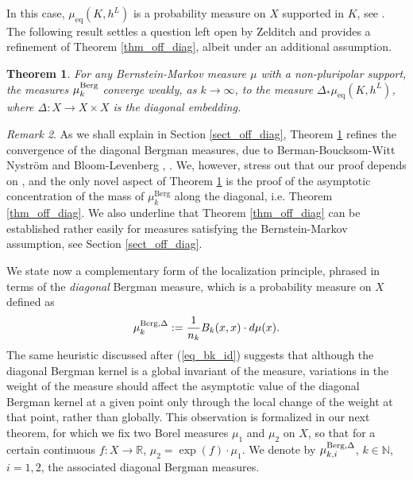 \documentclass[12pt]{article}
\numberwithin{equation}{section}
\theoremstyle{theorem}
\newtheorem{thm}{Theorem}[section]
\theoremstyle{definition}
\theoremstyle{remark}
\newtheorem{rem}[thm]{Remark}
\newcommand{\real}{\mathbb{R}}
\newcommand{\nat}{\mathbb{N}}
\begin{document}
	In this case, $\mu_{\mathrm{eq}}(K, h^L)$ is a probability measure on $X$ supported in $K$, see \cite[Proposition 1.10]{BermanBouckBalls}.
	The following result settles a question left open by Zelditch \cite[after Theorem 2.5]{ZelditchErgodSurvey} and provides a refinement of Theorem \ref{thm_off_diag}, albeit under an additional assumption.
	\begin{thm}\label{thm_off_diag_bm}
		For any Bernstein-Markov measure $\mu$ with a non-pluripolar support, the measures $\mu_k^{\rm{Berg}}$ converge weakly, as $k \to \infty$, to the measure $\Delta_* \mu_{\mathrm{eq}}(K, h^L)$, where $\Delta: X \to X \times X$ is the diagonal embedding.
	\end{thm}
	\begin{rem}
		As we shall explain in Section \ref{sect_off_diag}, Theorem \ref{thm_off_diag_bm} refines the convergence of the diagonal Bergman measures, due to Berman-Boucksom-Witt Nyström \cite{BerBoucNys} and Bloom-Levenberg \cite{BloomLeven1}, \cite{BloomLeven2}.
		We, however, stress out that our proof depends on \cite{BerBoucNys}, and the only novel aspect of Theorem \ref{thm_off_diag_bm} is the proof of the asymptotic concentration of the mass of $\mu_k^{\mathrm{Berg}}$ along the diagonal, i.e. Theorem \ref{thm_off_diag}.
		We also underline that Theorem \ref{thm_off_diag} can be established rather easily for measures satisfying the Bernstein-Markov assumption, see Section \ref{sect_off_diag}.
	\end{rem}
	\par
	We state now a complementary form of the localization principle, phrased in terms of the \textit{diagonal} Bergman measure, which is a probability measure on $X$ defined as
	\begin{equation}\label{eq_diag_bm}
		\mu_k^{\rm{Berg}, \Delta}
		:=
		\frac{1}{n_k} B_k(x, x) \cdot d \mu(x).
	\end{equation}
	The same heuristic discussed after (\ref{eq_bk_id}) suggests that although the diagonal Bergman kernel is a global invariant of the measure, variations in the weight of the measure should affect the asymptotic value of the diagonal Bergman kernel at a given point only through the local change of the weight at that point, rather than globally. This observation is formalized in our next theorem, for which we fix two Borel measures $\mu_1$ and $\mu_2$ on $X$, so that for a certain continuous $f : X \to \real$, $\mu_2 = \exp(f) \cdot \mu_1$.
	We denote by $\mu_{k, i}^{\rm{Berg}, \Delta}$, $k \in \nat$, $i = 1, 2$, the associated diagonal Bergman measures.
\end{document}

